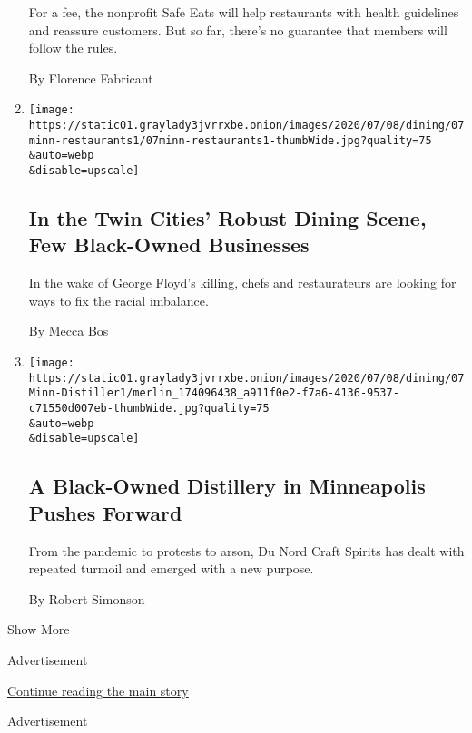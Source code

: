 \begin{enumerate}
  For a fee, the nonprofit Safe Eats will help restaurants with health
  guidelines and reassure customers. But so far, there's no guarantee
  that members will follow the rules.

  By Florence Fabricant
\item
  \href{/2020/07/07/dining/twin-cities-restaurants-racial-injustice.html}{}

  \texttt{[image: https://static01.graylady3jvrrxbe.onion/images/2020/07/08/dining/07minn-restaurants1/07minn-restaurants1-thumbWide.jpg?quality=75\\\&auto=webp\\\&disable=upscale]}

  \hypertarget{in-the-twin-cities-robust-dining-scene-few-black-owned-businesses}{%
  \subsection{In the Twin Cities' Robust Dining Scene, Few Black-Owned
  Businesses}\label{in-the-twin-cities-robust-dining-scene-few-black-owned-businesses}}

  In the wake of George Floyd's killing, chefs and restaurateurs are
  looking for ways to fix the racial imbalance.

  By Mecca Bos
\item
  \href{/2020/07/07/dining/drinks/du-nord-black-owned-distillery-minneapolis.html}{}

  \texttt{[image: https://static01.graylady3jvrrxbe.onion/images/2020/07/08/dining/07Minn-Distiller1/merlin\_174096438\_a911f0e2-f7a6-4136-9537-c71550d007eb-thumbWide.jpg?quality=75\\\&auto=webp\\\&disable=upscale]}

  \hypertarget{a-black-owned-distillery-in-minneapolis-pushes-forward}{%
  \subsection{A Black-Owned Distillery in Minneapolis Pushes
  Forward}\label{a-black-owned-distillery-in-minneapolis-pushes-forward}}

  From the pandemic to protests to arson, Du Nord Craft Spirits has
  dealt with repeated turmoil and emerged with a new purpose.

  By Robert Simonson
\end{enumerate}

Show More

Advertisement

\protect\hyperlink{after-mid1}{Continue reading the main story}

Advertisement

